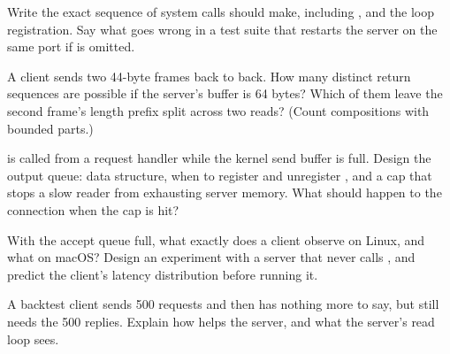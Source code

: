 \begin{exercises}
 Write the exact sequence of system calls  should make, including
,  and the loop registration. Say what goes wrong in a test suite that restarts the
server on the same port if  is omitted.

 A client sends two 44-byte frames back to back. How many distinct  return sequences
are possible if the server's buffer is 64 bytes? Which of them leave the second frame's length prefix split across two
reads? (Count compositions with bounded parts.)

  is called from a request handler while the kernel send buffer is full. Design the
output queue: data structure, when to register and unregister , and a cap that stops a slow reader from
exhausting server memory. What should happen to the connection when the cap is hit?

 With the accept queue full, what exactly does a client observe on Linux, and what on macOS?
Design an experiment with a server that never calls , and predict the client's  latency
distribution before running it.

 A backtest client sends 500 requests and then has nothing more to say, but still needs the 500
replies. Explain how  helps the server, and what the server's read loop sees.
\end{exercises}

